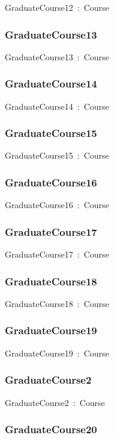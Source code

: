 \documentclass{article}
\begin{document}
GraduateCourse12~:~Course

\subsubsection*{GraduateCourse13}

GraduateCourse13~:~Course

\subsubsection*{GraduateCourse14}

GraduateCourse14~:~Course

\subsubsection*{GraduateCourse15}

GraduateCourse15~:~Course

\subsubsection*{GraduateCourse16}

GraduateCourse16~:~Course

\subsubsection*{GraduateCourse17}

GraduateCourse17~:~Course

\subsubsection*{GraduateCourse18}

GraduateCourse18~:~Course

\subsubsection*{GraduateCourse19}

GraduateCourse19~:~Course

\subsubsection*{GraduateCourse2}

GraduateCourse2~:~Course

\subsubsection*{GraduateCourse20}
\end{document}
